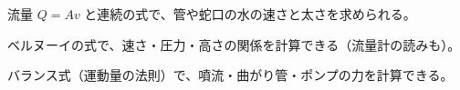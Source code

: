 \begin{furikaeri}
\begin{checklist}
\item 流量 $Q=Av$ と連続の式で、管や蛇口の水の速さと太さを求められる。
\item ベルヌーイの式で、速さ・圧力・高さの関係を計算できる（流量計の読みも）。
\item バランス式（運動量の法則）で、噴流・曲がり管・ポンプの力を計算できる。
\end{checklist}
\end{furikaeri}
